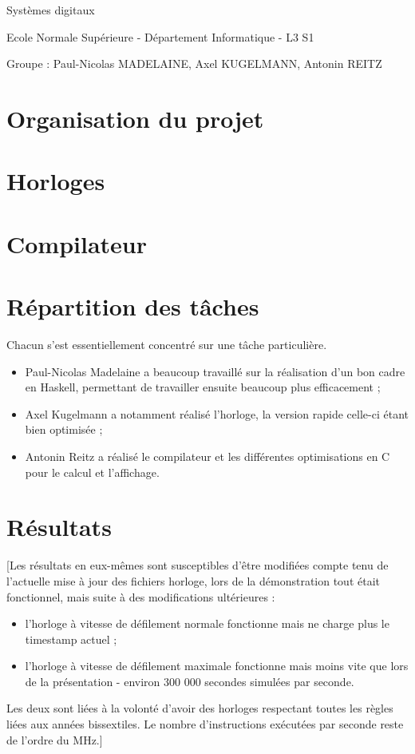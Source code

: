 \documentclass[a4paper,12pt,twoside]{article}
\begin{document}
\begin{center}
{\Huge Systèmes digitaux}
\end{center}
\begin{center}
{\Large Ecole Normale Supérieure - Département Informatique - L3 S1}
\end{center}

Groupe : Paul-Nicolas MADELAINE, Axel KUGELMANN, Antonin REITZ

\section{Organisation du projet}



\section{Horloges}



\section{Compilateur}



\section{Répartition des tâches}

Chacun s'est essentiellement concentré sur une tâche particulière.
\begin{itemize}
\item Paul-Nicolas Madelaine a beaucoup travaillé sur la réalisation d'un bon cadre en Haskell, permettant de travailler ensuite beaucoup plus efficacement ;
\item Axel Kugelmann a notamment réalisé l'horloge, la version rapide celle-ci étant bien optimisée ;
\item Antonin Reitz a réalisé le compilateur et les différentes optimisations en C pour le calcul et l'affichage.
\end{itemize}

\section{Résultats}

[Les résultats en eux-mêmes sont susceptibles d'être modifiées compte tenu de l'actuelle mise à jour des fichiers horloge, lors de la démonstration tout était fonctionnel, mais suite à des modifications ultérieures :
\begin{itemize}
\item l'horloge à vitesse de défilement normale fonctionne mais ne charge plus le timestamp actuel ;
\item l'horloge à vitesse de défilement maximale fonctionne mais moins vite que lors de la présentation - environ 300 000 secondes simulées par seconde.
\end{itemize}
Les deux sont liées à la volonté d'avoir des horloges respectant toutes les règles liées aux années bissextiles.
Le nombre d'instructions exécutées par seconde reste de l'ordre du MHz.]
\end{document}
